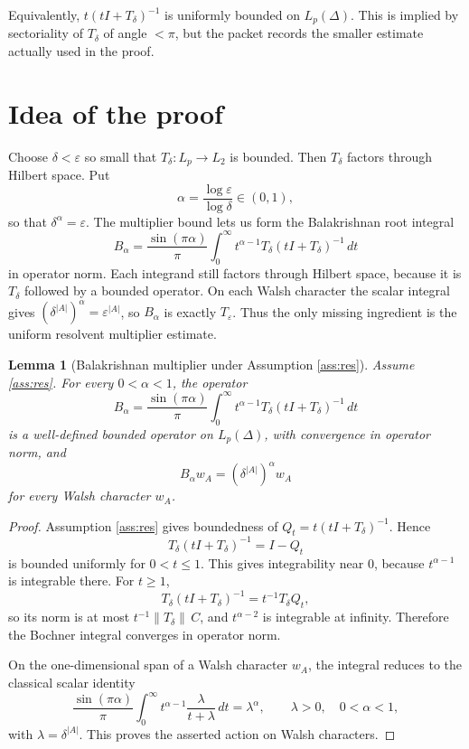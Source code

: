\documentclass[11pt]{article}
\newcommand{\DeltaG}{\Delta}
\newcommand{\eps}{\varepsilon}
\newtheorem{lemma}{Lemma}
\begin{document}
Equivalently, \(t(tI+T_\delta)^{-1}\) is uniformly bounded on \(L_p(\DeltaG)\).
This is implied by sectoriality of \(T_\delta\) of angle \(<\pi\), but the
packet records the smaller estimate actually used in the proof.

\section*{Idea of the proof}

Choose \(\delta<\eps\) so small that \(T_\delta:L_p\to L_2\) is bounded.
Then \(T_\delta\) factors through Hilbert space. Put
\[
        \alpha=\frac{\log\eps}{\log\delta}\in(0,1),
\]
so that \(\delta^\alpha=\eps\). The multiplier bound lets us form the
Balakrishnan root integral
\[
        B_\alpha=
        \frac{\sin(\pi\alpha)}{\pi}\int_0^\infty
        t^{\alpha-1}T_\delta(tI+T_\delta)^{-1}\,dt
\]
in operator norm. Each integrand still factors through Hilbert space, because
it is \(T_\delta\) followed by a bounded operator. On each Walsh character the
scalar integral gives \((\delta^{|A|})^\alpha=\eps^{|A|}\), so \(B_\alpha\)
is exactly \(T_\eps\). Thus the only missing ingredient is the uniform
resolvent multiplier estimate.

\begin{lemma}[Balakrishnan multiplier under Assumption \ref{ass:res}]
\label{lem:bal}
Assume \ref{ass:res}. For every \(0<\alpha<1\), the operator
\[
        B_\alpha=
        \frac{\sin(\pi\alpha)}{\pi}\int_0^\infty
        t^{\alpha-1}T_\delta(tI+T_\delta)^{-1}\,dt
\]
is a well-defined bounded operator on \(L_p(\DeltaG)\), with convergence in
operator norm, and
\[
        B_\alpha w_A=(\delta^{|A|})^\alpha w_A
\]
for every Walsh character \(w_A\).
\end{lemma}

\begin{proof}
Assumption \ref{ass:res} gives boundedness of \(Q_t=t(tI+T_\delta)^{-1}\).
Hence
\[
        T_\delta(tI+T_\delta)^{-1}=I-Q_t
\]
is bounded uniformly for \(0<t\le1\). This gives integrability near \(0\),
because \(t^{\alpha-1}\) is integrable there. For \(t\ge1\),
\[
        T_\delta(tI+T_\delta)^{-1}=t^{-1}T_\delta Q_t,
\]
so its norm is at most \(t^{-1}\|T_\delta\|\,C\), and
\(t^{\alpha-2}\) is integrable at infinity. Therefore the Bochner integral
converges in operator norm.

On the one-dimensional span of a Walsh character \(w_A\), the integral reduces
to the classical scalar identity
\[
        \frac{\sin(\pi\alpha)}{\pi}
        \int_0^\infty t^{\alpha-1}\frac{\lambda}{t+\lambda}\,dt
        =\lambda^\alpha,\qquad \lambda>0,\quad 0<\alpha<1,
\]
with \(\lambda=\delta^{|A|}\). This proves the asserted action on Walsh
characters.
\end{proof}
\end{document}
